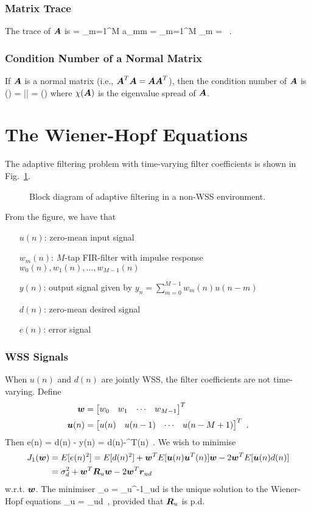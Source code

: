 \subsubsection{Matrix Trace}
The trace of $\boldsymbol{A}$ is
\bmath
  	 = \sum_{m=1}^M a_{mm} = \sum_{m=1}^M \lambda_m = \tr{\vect{\Lambda}}\ .
\emath

\subsubsection{Condition Number of a Normal Matrix}
If $\boldsymbol{A}$ is a normal matrix (i.e., $\boldsymbol{A}^T\boldsymbol{A}=\boldsymbol{A}\boldsymbol{A}^T$), then the condition number of $\boldsymbol{A}$ is
\bmath
  \kappa() = \left|\right| = \chi()
\emath
where $\chi(\boldsymbol{A})$ is the eigenvalue spread of $\boldsymbol{A}$.

\section{The Wiener-Hopf Equations}
The adaptive filtering problem with time-varying filter coefficients is shown in Fig.~\ref{fig:nonwss_block_diagram1}.
\begin{figure}[htbp]
  \centering
  \caption{Block diagram of adaptive filtering in a non-WSS environment.}
  \label{fig:nonwss_block_diagram1}
\end{figure}
From the figure, we have that
\begin{itemize}
  \item[$u(n)$:] zero-mean input signal
  \item[$w_m(n)$:] $M$-tap FIR-filter with impulse response $w_0(n),w_1(n),\ldots,w_{M-1}(n)$
  \item[$y(n)$:] output signal given by $y_n = \sum_{m=0}^{M-1}w_m(n) u(n-m)$
  \item[$d(n)$:] zero-mean desired signal
  \item[$e(n)$:] error signal
\end{itemize}
\subsubsection{WSS Signals}
When $u(n)$ and $d(n)$ are jointly WSS, the filter coefficients are not time-varying. Define
\begin{align}
  \boldsymbol{w} &= \begin{bmatrix} w_0 & w_{1} & \cdots & w_{M-1}\end{bmatrix}^T\\
  \boldsymbol{u}(n) &= \begin{bmatrix} u(n) & u(n-1) & \cdots & u(n-M+1)\end{bmatrix}^T\ .
\end{align}
Then
\bmath
  e(n) = d(n) - y(n) = d(n)-^T(n)\ .
\emath
We wish to minimise
\begin{align}
  J_1(\boldsymbol{w}) &= E[e(n)^2] = E[d(n)^2] + \boldsymbol{w}^T E[\boldsymbol{u}(n)\boldsymbol{u}^T(n)] \boldsymbol{w}-2\boldsymbol{w}^T E[\boldsymbol{u}(n) d(n)]\notag\\
  &= \sigma_d^2+\boldsymbol{w}^T\boldsymbol{R}_u\boldsymbol{w}-2\boldsymbol{w}^T\boldsymbol{r}_{ud}
\end{align}
w.r.t. $\boldsymbol{w}$. The minimiser
\bmath
  _o = _u^{-1}_{ud}
\emath
is the unique solution to the Wiener-Hopf equations
\bmath
  _u = _{ud}\ ,
\emath
provided that $\boldsymbol{R}_u$ is p.d. 
